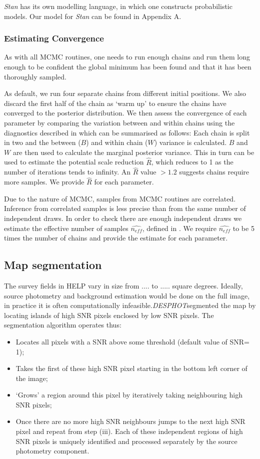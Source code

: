 \documentclass[useAMS,usenatbib]{mnras}
\begin{document}
\textit{Stan} has its own modelling language, in which one constructs probabilistic models. Our model for \textit{Stan} can be found in Appendix A.
\subsubsection{Estimating Convergence}\label{sec:conv}
As with all MCMC routines, one needs to run enough chains and run them long enough to be confident the global minimum has been found and that it has been thoroughly sampled. 

As default, we run four separate chains from different initial positions. We also discard the first half of the chain as `warm up' to ensure the chains have converged to the posterior distribution. We then assess the convergence of each parameter by comparing the variation between and within chains using the diagnostics described in \cite{BDA3} which can be summarised as follows: Each chain is split in two and the between ($B$) and within chain ($W$) variance is calculated. $B$ and $W$ are then used to calculate the marginal posterior variance. This in turn can be used to estimate the potential scale reduction $\hat{R}$, which reduces to 1 as the number of iterations tends to infinity. An $\hat{R}$ value $> 1.2$ suggests chains require more samples. We provide $\hat{R}$ for each parameter.

Due to the nature of MCMC, samples from MCMC routines are correlated. Inference from correlated samples is less precise than from the same number of independent draws. In order to check there are enough independent draws we estimate the effective number of samples $\hat{n_{eff}}$, defined in \cite{BDA3}. We require $\hat{n_{eff}}$ to be 5 times the number of chains and provide the estimate for each parameter.

\subsection{Map segmentation}
The survey fields in HELP vary in size from .... to ..... square degrees. Ideally, source photometry and background estimation would be done on the full image, in practice it is often computationally infeasible.\emph{DESPHOT}segmented the map by locating islands of high SNR pixels enclosed by low SNR pixels. The segmentation algorithm operates thus:
\begin{itemize}
\item Locates all pixels with a SNR above some threshold (default value of SNR= 1);
\item Takes the first of these high SNR pixel starting in the bottom left corner of the image;
\item `Grows' a region around this pixel by iteratively taking neighbouring high SNR pixels;
\item Once there are no more high SNR neighbours jumps to the next high SNR pixel and repeat from step (iii).
Each of these independent regions of high SNR pixels is uniquely identified and processed separately by the source photometry component.
\end{itemize}
\end{document}
